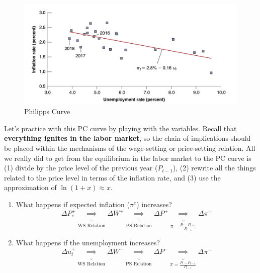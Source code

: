 \documentclass{extarticle}
\begin{document}
\begin{figure}[H]
    \centering 
    \includegraphics[width=0.5\linewidth]{PC.png} 
    \caption{Philipps Curve} 
    \label{fig:derivation} 
\end{figure}

Let's practice with this PC curve by playing with the variables. Recall that \textbf{everything ignites in the labor market}, so the chain of implications should be placed within the mechanisms of the wage-setting or price-setting relation. All we really did to get from the equilibrium in the labor market to the PC curve is (1) divide by the price level of the previous year ($P_{t-1}$), (2) rewrite all the things related to the price level in terms of the inflation rate, and (3) use the approximation of $\ln (1+x) \approx x$.
\begin{enumerate}
    \item What happens if expected inflation ($\pi^e$) increases?
    $$ \Delta P_e^+ \underbrace{\implies}_{\text{WS Relation}} \Delta W^+ \underbrace{\implies}_{\text{PS Relation}} \Delta P^+ \underbrace{\implies}_{\pi = \frac{P_t - P_{t-1}}{P_{t-1}}} \Delta \pi^+$$
    

    \item What happens if the unemployment increases?
    $$\Delta u_t^+ \underbrace{\implies}_{\text{WS Relation}} \Delta W^- \underbrace{\implies}_{\text{PS Relation}} \Delta P^- \underbrace{\implies}_{\pi = \frac{P_t - P_{t-1}}{P_{t-1}}} \Delta \pi^-$$
\end{enumerate}
\end{document}

